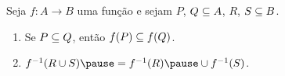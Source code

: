 \documentclass{beamer}
\begin{document}
    \begin{frame}
        \begin{proposicao}
            Seja $f : A \to B$ uma função \pause e sejam $P$, \pause $Q \subseteq A$, \pause $R$, \pause $S \subseteq B$.\pause
            \begin{enumerate}[label={\roman*})]
                \item Se $P \subseteq Q$, \pause então $f(P) \subseteq f(Q)$.\pause

                \vspace{.5cm}

                \item $f^{-1}(R \cup S) \pause = f^{-1}(R) \pause \cup f^{-1}(S)$.
            \end{enumerate}
        \end{proposicao}
    \end{frame}
\end{document}
